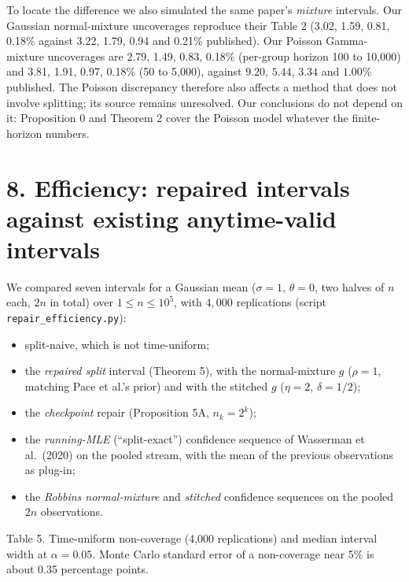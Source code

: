 \documentclass[
  10pt,
  a4paper,
]{article}
\providecommand{\tightlist}{%
  \setlength{\itemsep}{0pt}\setlength{\parskip}{0pt}}
\begin{document}
To locate the difference we also simulated the same paper's
\emph{mixture} intervals. Our Gaussian normal-mixture uncoverages
reproduce their Table 2 (3.02, 1.59, 0.81, 0.18\% against 3.22, 1.79,
0.94 and 0.21\% published). Our Poisson Gamma-mixture uncoverages are
2.79, 1.49, 0.83, 0.18\% (per-group horizon 100 to 10,000) and 3.81,
1.91, 0.97, 0.18\% (50 to 5,000), against \(9.20\), \(5.44\), \(3.34\)
and \(1.00\%\) published. The Poisson discrepancy therefore also affects
a method that does not involve splitting; its source remains unresolved.
Our conclusions do not depend on it: Proposition 0 and Theorem 2 cover
the Poisson model whatever the finite-horizon numbers.

\section{8. Efficiency: repaired intervals against existing
anytime-valid
intervals}\label{efficiency-repaired-intervals-against-existing-anytime-valid-intervals}

We compared seven intervals for a Gaussian mean (\(\sigma=1\),
\(\theta=0\), two halves of \(n\) each, \(2n\) in total) over
\(1\le n\le10^5\), with \(4{,}000\) replications (script
\texttt{repair\_efficiency.py}):

\begin{itemize}
\tightlist
\item
  split-naive, which is not time-uniform;
\item
  the \emph{repaired split} interval (Theorem 5), with the
  normal-mixture \(g\) (\(\rho=1\), matching Pace et al.'s prior) and
  with the stitched \(g\) (\(\eta=2\), \(\delta=1/2\));
\item
  the \emph{checkpoint} repair (Proposition 5A, \(n_k=2^k\));
\item
  the \emph{running-MLE} (``split-exact'') confidence sequence of
  Wasserman et al.~(2020) on the pooled stream, with the mean of the
  previous observations as plug-in;
\item
  the \emph{Robbins normal-mixture} and \emph{stitched} confidence
  sequences on the pooled \(2n\) observations.
\end{itemize}

Table 5. Time-uniform non-coverage (4,000 replications) and median
interval width at \(\alpha=0.05\). Monte Carlo standard error of a
non-coverage near 5\% is about 0.35 percentage points.
\end{document}
